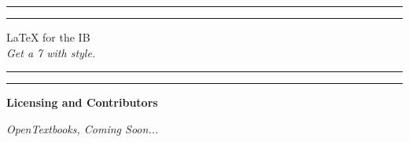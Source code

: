 \documentclass[12pt,a4paper]{article}
\begin{document}

\begin{titlepage}
\centering %
\scshape %
\vfill

\rule{\textwidth}{1.6pt}\vspace*{-\baselineskip}\vspace*{2pt}
\rule{\textwidth}{0.4pt}

\vspace{1.5\baselineskip} %
\LARGE{\LaTeX{} for the IB}\\
\vspace{0.2\baselineskip}
\small{\textit{Get a 7 with style.}}
\vspace{0.75\baselineskip} %

\rule{\textwidth}{0.4pt}\vspace*{-\baselineskip}\vspace{3.2pt}
\rule{\textwidth}{1.6pt}

\vfill
\end{titlepage}



\begin{center}
\Large{\textbf{Licensing and Contributors}}

\vfill
\small{\textit{OpenTextbooks, Coming Soon\texttrademark...}}
\vfill

\newpage
\end{center}

\begin{center}
\tableofcontents
\newpage
\end{center}




\newpage


\newpage


\newpage

\end{document}
